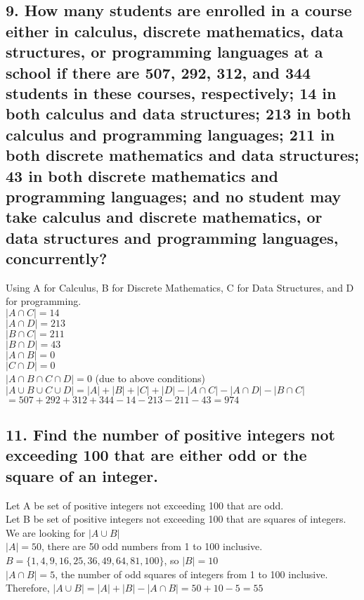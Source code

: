 \documentclass[11pt, oneside]{article} %
\numberwithin{equation}{section} %
\numberwithin{figure}{section} %
\numberwithin{table}{section} %
\begin{document}
\subsection{9. How many students are enrolled in a course either in calculus, discrete mathematics, data structures, or programming languages at a school if there are 507, 292, 312, and 344 students in these courses, respectively; 14 in both calculus and data structures; 213 in both calculus and programming languages; 211 in both discrete mathematics and data structures; 43 in both discrete mathematics and programming languages; and no student may take calculus and discrete mathematics, or data structures and programming languages, concurrently?}
Using A for Calculus, B for Discrete Mathematics, C for Data Structures, and D for programming. \\
$|A \cap C| = 14$\\
$|A \cap D| = 213$\\
$|B \cap C| = 211$\\
$|B \cap D| = 43$\\
$|A \cap B| = 0$\\
$|C \cap D| = 0$\\
$|A \cap B \cap C \cap D| = 0$ (due to above conditions)\\
$|A \cup B \cup C \cup D| = |A| + |B| +|C| + |D| - |A \cap C| - |A \cap D| - |B \cap C|$
$= 507 + 292 + 312 + 344 - 14 - 213 - 211 - 43 = 974$ 

\subsection{11. Find the number of positive integers not exceeding 100 that are either odd or the square of an integer.}
Let A be set of positive integers not exceeding 100 that are odd. \\
Let B be set of positive integers not exceeding 100 that are squares of integers. \\
We are looking for $|A\cup B|$ \\
$|A| = 50$, there are 50 odd numbers from 1 to 100 inclusive. \\
$B = \{1,4,9,16,25,36,49,64,81,100\}$, so $|B| = 10$ \\
$|A \cap B| = 5$, the number of odd squares of integers from 1 to 100 inclusive. \\
Therefore, $|A\cup B| = |A| + |B| - |A \cap B| = 50 + 10 - 5 = 55$


\end{document}
